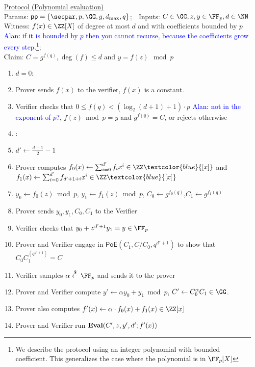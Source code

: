 \documentclass{article}
\begin{document}
\begin{small}
 \begin{minipage}{1.1\textwidth}
\begin{mdframed}[userdefinedwidth=1\textwidth]  \label{prot:Opening}
	\noindent \underline{\textsf{Protocol \eval} (Polynomial evaluation)}\\
\noindent Params: $\crs=\{\secpar,p,\GG,g,d_{\max},q\}$;\ \
Inputs: $C\in \GG,z,y\in \FF_p,d \in \NN $\\
Witness: $f(x) \in \ZZ[X]$ of degree at most $d$ and with coefficients bounded by $p$ \textcolor{blue}{Alan: if it is bounded by $p$ then you cannot recurse, because the coefficients grow every step.}\footnote{We describe the protocol using an integer polynomial with bounded coefficient. This generalizes the case where the polynomial is in $\FF_p[X]$};\\ 
Claim: $C=g^{f(q)},\deg(f)\leq d$ and $y=f(z) \mod p$

\begin{enumerate}[nolistsep]
\item \pcif $d=0$:
\item \pcind[1] Prover sends $f(x)$ to the verifier, $f(x)$ is a constant. 
\item \pcind[1] Verifier checks that $0\leq f(q)< (\log_2(d+1)+1)\cdot p$ \textcolor{blue}{Alan: not in the exponent of $p$?},  $f(z) \bmod p=y$ and $g^{f(q)}=C$, or rejects otherwise
\item \pcelse: 
\item \pcind[1] $d'\gets \frac{d+1}{2}-1$
\item \pcind[1] Prover computes $f_0(x)\gets\sum_{i=0}^{d'} f_i x^i\in \ZZ\textcolor{blue}{[x]}$ and $f_1(x)\gets\sum_{i=0}^{d'} f_{d'+1+i} x^{i}\in \ZZ\textcolor{blue}{[x]}$
\item \pcind[1] $y_0\gets f_0(z) \bmod p$, $y_1\gets f_1(z)\bmod p$, $C_0\gets g^{f_0(q)}$,$C_1\gets g^{f_1(q)}$
\item \pcind[1] Prover sends $y_0,y_1,C_0,C_1$ to the Verifier
\item \pcind[1] Verifier checks that $y_0+z^{d'+1} y_1=y\in \FF_p$ 
\item \pcind[1] Prover and Verifier engage in $\textsf{PoE}(C_1,C/C_0,q^{d'+1})$ to show that $C_0C_1^{(q^{d'+1})}=C$
\item \pcind[1] Verifier samples $\alpha \sample \FF_p$ and sends it to the prover
\item \pcind[1] Prover and Verifier compute $y'\gets\alpha y_0 +y_1 \bmod p$, $C'\gets C_0^{\alpha}C_1 \in \GG$. 
\item \pcind[1] Prover also computes $f'(x)\gets\alpha  \cdot f_0(x)+f_1(x) \in \ZZ[x]$ 
\item \pcind[1] Prover and Verifier run $\textbf{{Eval}}(C',z,y',d';f'(x))$
\end{enumerate}
\end{mdframed}
\end{minipage}
\end{small}
\end{document}
